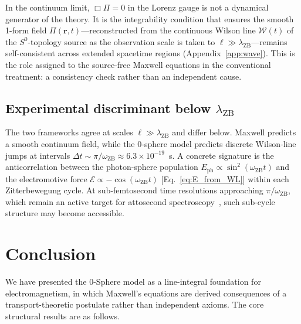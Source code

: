 \documentclass[%
 reprint, amsmath,amssymb, aps, prb, ]{revtex4-2}
\numberwithin{equation}{section}
\newcommand{\omZB}{\omega_{\text{ZB}}}
\newcommand{\EphS}{E_{\text{ph}}}
\newcommand{\WL}{\mathcal{W}}
\begin{document}
In the continuum limit, $\Box\Pi = 0$ in the Lorenz gauge is not a dynamical generator of the theory. It is the integrability condition that ensures the smooth 1-form field $\Pi(\mathbf{r},t)$---reconstructed from the continuous Wilson line $\WL(t)$ of the $S^0$-topology source as the observation scale is taken to $\ell\gg\lambda_{\text{ZB}}$---remains self-consistent across extended spacetime regions (Appendix~\ref{app:wave}). This is the role assigned to the source-free Maxwell equations in the conventional treatment: a consistency check rather than an independent cause.

\subsection{Experimental discriminant below $\lambda_{\text{ZB}}$}

The two frameworks agree at scales $\ell\gg\lambda_{\text{ZB}}$ and differ below. Maxwell predicts a smooth continuum field, while the 0-sphere model predicts discrete Wilson-line jumps at intervals $\Delta t \sim \pi/\omZB \approx 6.3\times10^{-19}$~s. A concrete signature is the anticorrelation between the photon-sphere population $\EphS\propto\sin^2(\omZB t)$ and the electromotive force $\mathcal{E}\propto-\cos(\omZB t)$ [Eq.~\eqref{eq:E_from_WL}] within each Zitterbewegung cycle. At sub-femtosecond time resolutions approaching $\pi/\omZB$, which remain an active target for attosecond spectroscopy~\cite{Krausz2009}, such sub-cycle structure may become accessible.

\section{Conclusion}
\label{sec:conclusion}

We have presented the 0-Sphere model as a line-integral foundation for electromagnetism, in which Maxwell's equations are derived consequences of a transport-theoretic postulate rather than independent axioms. The core structural results are as follows.
\end{document}
